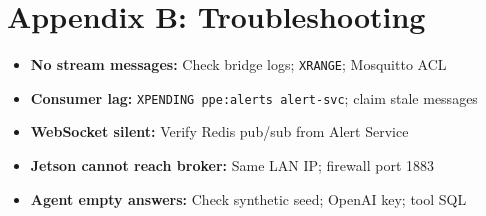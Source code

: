 \documentclass[12pt,a4paper]{report}
\begin{document}
\chapter{Appendix B: Troubleshooting}

\begin{itemize}
    \item \textbf{No stream messages:} Check bridge logs; \texttt{XRANGE}; Mosquitto ACL
    \item \textbf{Consumer lag:} \texttt{XPENDING ppe:alerts alert-svc}; claim stale messages
    \item \textbf{WebSocket silent:} Verify Redis pub/sub from Alert Service
    \item \textbf{Jetson cannot reach broker:} Same LAN IP; firewall port 1883
    \item \textbf{Agent empty answers:} Check synthetic seed; OpenAI key; tool SQL
\end{itemize}
\end{document}
